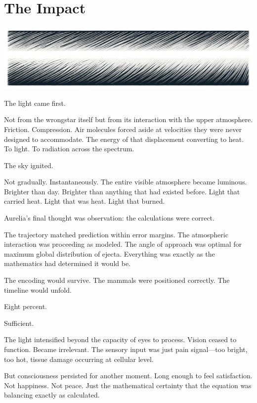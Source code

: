 \chapter{The Impact}
\label{ch:15}



\begin{center}
\includegraphics[width=\textwidth]{images/chapterImages/genesis_sketch_00098_.png}
\end{center}

The light came first.

Not from the wrongstar itself but from its interaction with the upper atmosphere. Friction. Compression. Air molecules forced aside at velocities they were never designed to accommodate. The energy of that displacement converting to heat. To light. To radiation across the spectrum.

The sky ignited.

Not gradually. Instantaneously. The entire visible atmosphere became luminous. Brighter than day. Brighter than anything that had existed before. Light that carried heat. Light that was heat. Light that burned.

Aurelia's final thought was observation: the calculations were correct.

The trajectory matched prediction within error margins. The atmospheric interaction was proceeding as modeled. The angle of approach was optimal for maximum global distribution of ejecta. Everything was exactly as the mathematics had determined it would be.

The encoding would survive. The mammals were positioned correctly. The timeline would unfold.

Eight percent.

Sufficient.

The light intensified beyond the capacity of eyes to process. Vision ceased to function. Became irrelevant. The sensory input was just pain signal—too bright, too hot, tissue damage occurring at cellular level.

But consciousness persisted for another moment. Long enough to feel satisfaction. Not happiness. Not peace. Just the mathematical certainty that the equation was balancing exactly as calculated.

